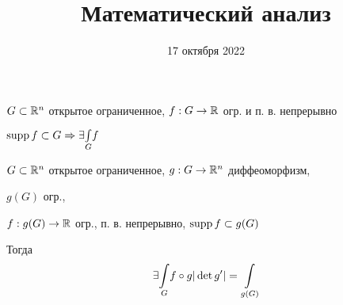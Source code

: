 


    \title{Математический анализ}
    \date{17 октября 2022}
    \maketitle

    \pagebreak

    $G \subset \mathbb{R}^n$ открытое ограниченное, $f : G \rightarrow \mathbb{R}$ огр. и п. в. непрерывно
    \par $\operatorname{supp} f \subset G \Rightarrow \exists \underset{G}{\int} f$

    \begin{theorem}
        $G \subset \mathbb{R}^n$ открытое ограниченное, $g : G \rightarrow \mathbb{R}^n$ диффеоморфизм,
        \par \quad $g(G)$ огр.,
        \par \quad $f : g(G) \rightarrow \mathbb{R}$ огр., п. в. непрерывно, $\operatorname{supp} f \subset g(G)$
        \par Тогда
        \[
            \exists \rhimani{G} f \circ g |\det g'| = \rhimani{g(G)} %
        \]
    \end{theorem}

